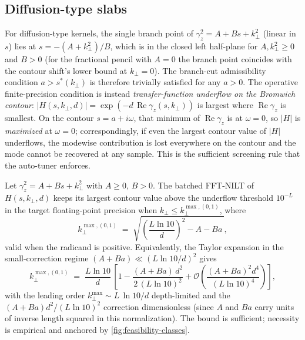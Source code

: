\documentclass[manuscript,review]{acmart}
\newcommand{\kperp}{k_\perp}
\newcommand{\kpmax}[1][]{k_\perp^{\max#1}}
\newcommand{\gammaz}{\gamma_z}
\newcommand{\Real}{\operatorname{Re}}
\begin{document}
\subsection{Diffusion-type slabs}\label{sec:par-bound}

For diffusion-type kernels, the single branch point of $\gammaz^2 =
A + Bs + \kperp^2$ (linear in $s$) lies at $s = -(A + \kperp^2)/B$,
which is in the closed left half-plane for $A, \kperp^2 \ge 0$ and
$B > 0$ (for the fractional pencil with $A = 0$ the branch point
coincides with the contour shift's lower bound at $\kperp = 0$).
The branch-cut admissibility condition $a > s^*(\kperp)$ is therefore
trivially satisfied for any $a > 0$. The operative finite-precision
condition is instead \emph{transfer-function underflow on the
Bromwich contour}: $|H(s, \kperp, d)| = \exp(-d\,\Real\gammaz(s,
\kperp))$ is largest where $\Real\gammaz$ is smallest. On the
contour $s = a + i\omega$, that minimum of $\Real\gammaz$ is at
$\omega = 0$, so $|H|$ is \emph{maximized} at $\omega = 0$;
correspondingly, if even the largest contour value of $|H|$
underflows, the modewise contribution is lost everywhere on the
contour and the mode cannot be recovered at any sample. This is
the sufficient screening rule that the auto-tuner enforces.

\begin{proposition}\label{thm:par-bound}
Let $\gammaz^2 = A + Bs + \kperp^2$ with $A \ge 0$, $B > 0$. The
batched FFT-NILT of $H(s, \kperp, d)$ keeps its largest contour
value above the underflow threshold $10^{-L}$ in the target
floating-point precision when $\kperp \le \kpmax[,(0,1)]$, where
\begin{equation}
\kpmax[,(0,1)] \;=\; \sqrt{\left(\frac{L \ln 10}{d}\right)^2 - A - Ba\,},
\label{eq:par-cutoff}
\end{equation}
valid when the radicand is positive. Equivalently, the Taylor
expansion in the small-correction regime $(A + Ba) \ll (L\ln 10/d)^2$
gives
\begin{equation}
\kpmax[,(0,1)]
\;=\;
\frac{L \ln 10}{d}\,
\left[1 - \frac{(A + Ba)\,d^2}{2\,(L \ln 10)^2}
       + \mathcal{O}\!\left(\frac{(A + Ba)^2 d^4}{(L\ln 10)^4}\right)
\right],
\end{equation}
with the leading order $\kpmax \sim L\,\ln 10 / d$ depth-limited
and the $(A + Ba) d^2 / (L\ln 10)^2$ correction dimensionless (since
$A$ and $Ba$ carry units of inverse length squared in this
normalization). The bound is sufficient; necessity is empirical and
anchored by \cref{fig:feasibility-classes}.
\end{proposition}
\end{document}
